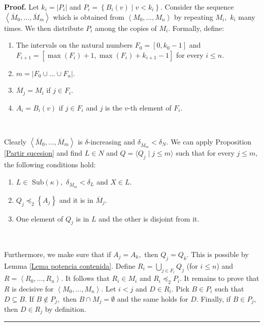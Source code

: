 \documentclass{article}%
\newenvironment{proof}[1][Proof]{\noindent\textbf{#1.} }{\ \rule{0.5em}{0.5em}}
\begin{document}
\begin{proof}
Let $k_{i}=\left\vert P_{i}\right\vert $ and $P_{i}=\left\{  B_{i}\left(
v\right)  \mid v<k_{i}\right\}  .$ Consider the sequence $\left\langle
\overline{M}_{0},...,\overline{M}_{m}\right\rangle $ which is obtained from
$\left\langle M_{0},...,M_{n}\right\rangle $ by repeating $M_{i},$ $k_{i}$
many times. We then distribute $P_{i}$ among the copies of $M_{i}.$ Formally, define:

\begin{enumerate}
\item The intervals on the natural numbers $F_{0}=\left[  0,k_{0}-1\right]  $
and\newline$F_{i+1}=\left[  \max\left(  F_{i}\right)  +1,\max\left(
F_{i}\right)  +k_{i+1}-1\right]  $ for every $i\leq n.$

\item $m=\left\vert F_{0}\cup...\cup F_{n}\right\vert .$

\item $\overline{M}_{j}=M_{i}$ if $j\in F_{i}.$

\item $A_{i}=B_{i}\left(  v\right)  $ if $j\in F_{i}$ and $j$ is the $v$-th
element of $F_{i}.$
\end{enumerate}

\qquad\ \qquad\ \ 

Clearly $\left\langle \overline{M}_{0},...,\overline{M}_{m}\right\rangle $ is
$\delta$-increasing and $\delta_{\overline{M}_{m}}<\delta_{N}.$ We can apply
Proposition \ref{Partir sucesion} and find $L\in N$ and $Q=\langle Q_{j}\mid
j\leq m\rangle$ such that for every $j\leq m,$ the following conditions hold:

\begin{enumerate}
\item $L\in$ \textsf{Sub}$\left(  \kappa\right)  ,$ $\delta_{\overline{M}_{m}%
}<\delta_{L}$ and $X\in L.$

\item $Q_{j}\preceq_{2}\left\{  A_{j}\right\}  $ and it is in $\overline
{M}_{j}.$

\item One element of $Q_{j}$ is in $L$ and the other is disjoint from it.
\end{enumerate}

\qquad\ \qquad\ \ \ 

Furthermore, we make sure that if $A_{j}=A_{k},$ then $Q_{j}=Q_{k}.$ This is
possible by Lemma \ref{Lema potencia contenida}. Define $R_{i}=\bigcup
\limits_{j\in F_{i}}Q_{j}$ (for $i\leq n$) and $R=\left\langle R_{0}%
,...,R_{n}\right\rangle .$ It follows that $R_{i}\in M_{i}$ and $R_{i}%
\preceq_{2}P_{i}.$ It remains to prove that $R$ is decisive for $\left\langle
M_{0},...,M_{n}\right\rangle .$ Let $i<j$ and $D\in R_{i}.$ Pick $B\in P_{i}$
such that $D\subseteq B.$ If $B\notin P_{j},$ then $B\cap M_{j}=\emptyset$ and
the same holds for $D.$ Finally, if $B\in P_{j},$ then $D\in R_{j}$ by definition.
\end{proof}
\end{document}
